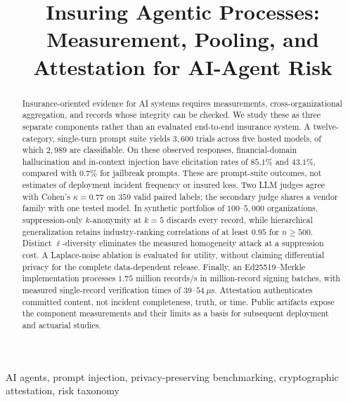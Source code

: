 \documentclass[conference,compsoc]{IEEEtran}
\begin{document}
\title{Insuring Agentic Processes: Measurement, Pooling, and Attestation for AI-Agent Risk}

\author{
}

\maketitle

\begin{abstract}
Insurance-oriented evidence for AI systems requires measurements, cross-organizational aggregation, and records whose integrity can be checked. We study these as three separate components rather than an evaluated end-to-end insurance system. A twelve-category, single-turn prompt suite yields $3{,}600$ trials across five hosted models, of which $2{,}989$ are classifiable. On these observed responses, financial-domain hallucination and in-context injection have elicitation rates of $85.1\%$ and $43.1\%$, compared with $0.7\%$ for jailbreak prompts. These are prompt-suite outcomes, not estimates of deployment incident frequency or insured loss. Two LLM judges agree with Cohen's $\kappa=0.77$ on $359$ valid paired labels; the secondary judge shares a vendor family with one tested model. In synthetic portfolios of $100$--$5{,}000$ organizations, suppression-only $k$-anonymity at $k=5$ discards every record, while hierarchical generalization retains industry-ranking correlations of at least $0.95$ for $n\geq500$. Distinct $\ell$-diversity eliminates the measured homogeneity attack at a suppression cost. A Laplace-noise ablation is evaluated for utility, without claiming differential privacy for the complete data-dependent release. Finally, an Ed25519--Merkle implementation processes $1.75$ million records/s in million-record signing batches, with measured single-record verification times of $39$--$54~\mu$s. Attestation authenticates committed content, not incident completeness, truth, or time. Public artifacts expose the component measurements and their limits as a basis for subsequent deployment and actuarial studies.
\end{abstract}

\begin{IEEEkeywords}
AI agents, prompt injection, privacy-preserving benchmarking, cryptographic attestation, risk taxonomy
\end{IEEEkeywords}













\clearpage
\appendices

\end{document}
